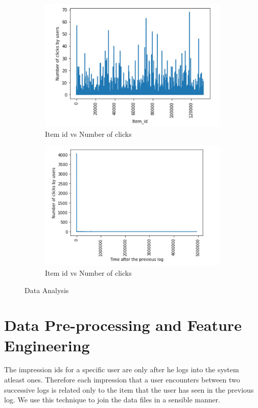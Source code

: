 \documentclass{scrreprt}
\begin{document}
\begin{figure}[!h]
\begin{subfigure}{.5\textwidth}
  \centering
  \includegraphics[scale=0.30]{3}
  \caption{Item id vs Number of clicks}
\end{subfigure}%
\begin{subfigure}{.5\textwidth}
  \centering
  \includegraphics[scale=0.30]{4}
  \caption{Item id vs Number of clicks}
\end{subfigure}

\caption{ Data Analysis}
\end{figure}

\section{Data Pre-processing and Feature Engineering}
The impression ids for a specific user are only after he logs into the system atleast ones. Therefore each impression that a user encounters between two successive logs is related only to the item that the user has seen in the previous log. We use this technique to join the data files in a sensible manner.
\end{document}
